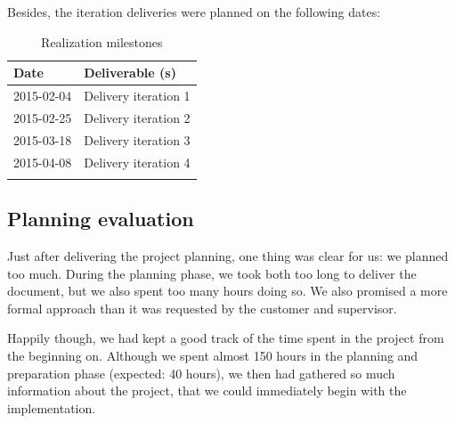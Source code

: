 %
Besides, the iteration deliveries were planned on the following dates:
\begin{longtable}{|l|l|}\hline
    \textbf{Date} & \textbf{Deliverable (s)} \\\hline
	\endhead
    2015-02-04 & Delivery iteration 1\\\hline
    2015-02-25 & Delivery iteration 2\\\hline
    2015-03-18 & Delivery iteration 3\\\hline
    2015-04-08 & Delivery iteration 4\\\hline
  \caption{Realization milestones}
  \label{tab:realization-milestones}
\end{longtable}


\subsection{Planning evaluation}
Just after delivering the project planning, one thing was clear for us: we planned too much.
During the planning phase, we took both too long to deliver the document, but we also spent too many hours doing so.
We also promised a more formal approach than it was requested by the customer and supervisor.

Happily though, we had kept a good track of the time spent in the project from the beginning on.
Although we spent almost 150 hours in the planning and preparation phase (expected: 40 hours), we then had gathered so much information about the project, that we could immediately begin with the implementation.


